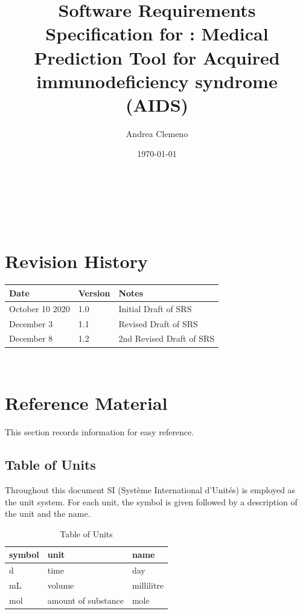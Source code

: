 \documentclass[12pt]{article}
\begin{document}
\title{Software Requirements Specification for \progname: Medical Prediction 
Tool for Acquired immunodeficiency syndrome (AIDS)} 
\author{Andrea Clemeno}
\date{\today}
	
\maketitle

~\newpage


\tableofcontents

~\newpage

\section*{Revision History}

\begin{tabularx}{\textwidth}{p{3cm}p{2cm}X}
\toprule {\bf Date} & {\bf Version} & {\bf Notes}\\
\midrule
October 10 2020 & 1.0 & Initial Draft of SRS\\
December 3 & 1.1 & Revised Draft of SRS\\
December 8 & 1.2 & 2nd Revised Draft of SRS\\
\bottomrule
\end{tabularx}

~\newpage

\section{Reference Material}

This section records information for easy reference.

\subsection{Table of Units}

Throughout this document SI (Syst\`{e}me International d'Unit\'{e}s) is employed
as the unit system. For each unit, the symbol is given followed by a
description of the unit and the name.

\renewcommand{\arraystretch}{1.2}
\begin{table}[h!]
\begin{center}
 \noindent \begin{tabular}{l l l}
    \toprule		
    \textbf{symbol} & \textbf{unit} & \textbf{name}\\
    \midrule 
    \si{\day} & time & day\\
    mL & volume	& millilitre\\
    \si{\mole} & amount of substance & mole\\
    \bottomrule
  \end{tabular}
  \end{center}
  	\caption{Table of Units}
\end{table}
\end{document}
